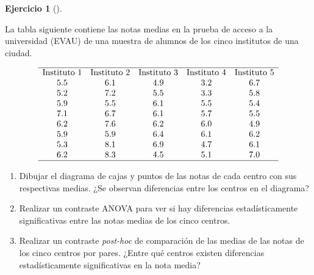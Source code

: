 \documentclass[
  a4paper,
]{scrreport}
\theoremstyle{definition}
\newtheorem{exercise}{Ejercicio}[chapter]
\theoremstyle{remark}
\begin{document}
\begin{exercise}[]\protect\hypertarget{exr-anova-un-factor-evau}{}\label{exr-anova-un-factor-evau}

La tabla siguiente contiene las notas medias en la prueba de acceso a la
universidad (EVAU) de una muestra de alumnos de los cinco institutos de
una ciudad.

\[
\begin{array}{ccccc}
\hline
\mbox{Instituto 1} & \mbox{Instituto 2} & \mbox{Instituto 3} & \mbox{Instituto 4} & \mbox{Instituto 5} \\
5.5 & 6.1 & 4.9 & 3.2 & 6.7 \\
5.2 & 7.2 & 5.5 & 3.3 & 5.8 \\
5.9 & 5.5 & 6.1 & 5.5 & 5.4 \\
7.1 & 6.7 & 6.1 & 5.7 & 5.5 \\
6.2 & 7.6 & 6.2 & 6.0 & 4.9 \\
5.9 & 5.9 & 6.4 & 6.1 & 6.2 \\
5.3 & 8.1 & 6.9 & 4.7 & 6.1 \\
6.2 & 8.3 & 4.5 & 5.1 & 7.0 \\
\hline
\end{array}
\]

\begin{enumerate}
\def\labelenumi{\alph{enumi}.}
\item
  Dibujar el diagrama de cajas y puntos de las notas de cada centro con
  sus respectivas medias. ¿Se observan diferencias entre los centros en
  el diagrama?
\item
  Realizar un contraste ANOVA para ver si hay diferencias
  estadísticamente significativas entre las notas medias de los cinco
  centros.
\item
  Realizar un contraste \emph{post-hoc} de comparación de las medias de
  las notas de los cinco centros por pares. ¿Entre qué centros existen
  diferencias estadísticamente significativas en la nota media?
\end{enumerate}

\end{exercise}
\end{document}
